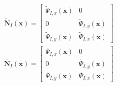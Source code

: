 \begin{equation}
\begin{split}
    \tilde{\pmb{N}}_I(\pmb{x})= \left[\begin{matrix}\tilde{\Psi}_{I,x}(\pmb{x})&0\\0&\tilde{\Psi}_{I,y}(\pmb{x})\\\tilde{\Psi}_{I,y}(\pmb{x})&\tilde{\Psi}_{I,x}(\pmb{x}) \end{matrix}\right] 
\end{split}
\end{equation}
\begin{equation}
\begin{split}
    \bar{\pmb{N}}_I(\pmb{x})= \left[\begin{matrix}\bar{\Psi}_{I,x}(\pmb{x})&0\\0&\bar{\Psi}_{I,y}(\pmb{x})\\\bar{\Psi}_{I,y}(\pmb{x})&\bar{\Psi}_{I,x}(\pmb{x}) \end{matrix}\right] 
\end{split}
\end{equation}
